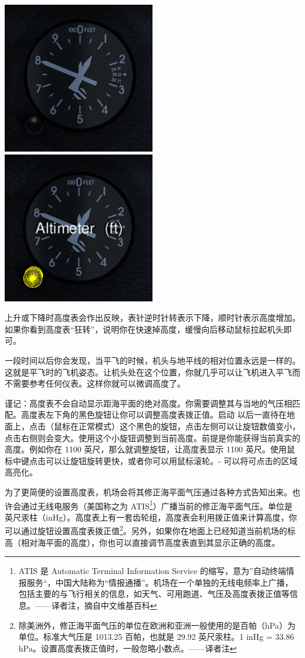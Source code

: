 \centerline{
  \includegraphics[width=0.5\textwidth]{img/basic_tutorial/altimeter}
  \includegraphics[width=0.5\textwidth]{img/basic_tutorial/altimeter-hotspot}
}
\medskip

上升或下降时高度表会作出反映，表针逆时针转表示下降，顺时针表示高度增加。如果你看到高度表“狂转”，说明你在快速掉高度，缓慢向后移动鼠标拉起机头即可。

一段时间以后你会发现，当平飞的时候，机头与地平线的相对位置永远是一样的。这就是平飞时的飞机姿态。让机头处在这个位置，你就几乎可以让飞机进入平飞而不需要参考任何仪表。这样你就可以微调高度了。

谨记：高度表不会自动显示距海平面的绝对高度。你需要调整其与当地的气压相匹配。高度表左下角的黑色旋钮让你可以调整高度表拨正值。启动 \FlightGear{} 以后一直待在地面上，点击（鼠标在正常模式）这个黑色的旋钮，点击左侧可以让旋钮数值变小，点击右侧则会变大。使用这个小旋钮调整到当前高度。前提是你能获得当前真实的高度。例如你在 1100 英尺，那么就调整旋钮，让高度表显示 1100 英尺。使用鼠标中键点击可以让旋钮旋转更快，或者你可以用鼠标滚轮。- 可以将可点击的区域高亮化。

为了更简便的设置高度表，机场会将其修正海平面气压通过各种方式告知出来。也许会通过无线电服务（美国称之为 ATIS\footnote{ATIS 是 Automatic Terminal Information Service 的缩写，意为”自动终端情报服务“，中国大陆称为“情报通播”。机场在一个单独的无线电频率上广播，包括主要的与飞行相关的信息，如天气、可用跑道、气压及高度表拨正值等信息。——译者注，摘自中文维基百科}）广播当前的修正海平面气压。单位是英尺汞柱（inHg）。高度表上有一套齿轮组，高度表会利用拨正值来计算高度，你可以通过旋钮设置高度表拨正值\footnote{除美洲外，修正海平面气压的单位在欧洲和亚洲一般使用的是百帕（hPa）为单位。标准大气压是 1013.25 百帕，也就是 29.92 英尺汞柱。1 inHg = 33.86 hPa。设置高度表拨正值时，一般忽略小数点。——译者注}。另外，如果你在地面上已经知道当前机场的标高（相对海平面的高度），你也可以直接调节高度表直到其显示正确的高度。

